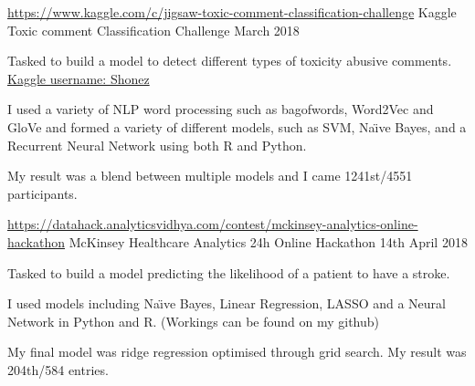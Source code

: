 \begin{cventries}
  \cventry
    {
    \href{https://www.kaggle.com/c/jigsaw-toxic-comment-classification-challenge}{https://www.kaggle.com/c/jigsaw-toxic-comment-classification-challenge}
    } %
    {Kaggle Toxic comment Classification Challenge} %
    {} %
    {March 2018} %
    {
      \begin{cvitems} %
        \item {Tasked to build a model to detect different types of toxicity abusive comments. \href{https://www.kaggle.com/shonez}{Kaggle username: Shonez}}
        \item {I used a variety of NLP word processing such as bagofwords, Word2Vec and GloVe and formed a variety of different models, such as SVM, Na\"\i ve Bayes, and a Recurrent Neural Network using both R and Python. }
        \item{My result was a blend between multiple models and I came 1241st/4551 participants.}
      \end{cvitems}
    }

  \cventry
    {
    \href{https://datahack.analyticsvidhya.com/contest/mckinsey-analytics-online-hackathon}{https://datahack.analyticsvidhya.com/contest/mckinsey-analytics-online-hackathon} }%
    {McKinsey Healthcare Analytics 24h Online Hackathon} %
    {} %
    {14th April 2018} %
    {
      \begin{cvitems} %
        \item {Tasked to build a model predicting the likelihood of a patient to have a stroke.}
        \item {I used models including Na\"\i ve Bayes, Linear Regression, LASSO and a Neural Network in Python and R. (Workings can be found on my github)}
        \item{My final model was ridge regression optimised through grid search. My result was 204th/584 entries.}
      \end{cvitems}
    }
    

\end{cventries}
